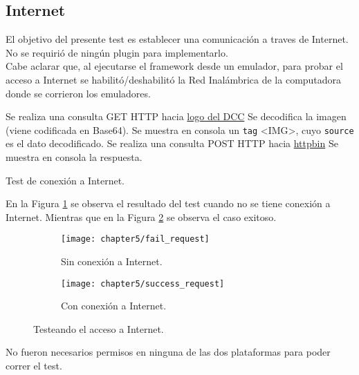 \subsection{Internet}
El objetivo del presente test es establecer una comunicación a traves de Internet. No se requirió de ningún plugin para implementarlo.\\
Cabe aclarar que, al ejecutarse el framework desde un emulador, para probar el acceso a Internet se habilitó/deshabilitó la Red Inalámbrica de la computadora donde se corrieron los emuladores.\\
\begin{algorithm}
	\begin{algorithmic}[1]
		\STATE Se realiza una consulta GET HTTP hacia \href{https://dcc.fceia.unr.edu.ar/sites/all/themes/birthofcool/images/logo-lcc.png}{logo del DCC}
		\STATE Se decodifica la imagen (viene codificada en Base64).
		\STATE Se muestra en consola un \texttt{tag} \textless IMG\textgreater, cuyo \texttt{source} es el dato decodificado.
		\STATE Se realiza una consulta POST HTTP hacia \href{http://httpbin.org/post}{httpbin}
		\STATE Se muestra en consola la respuesta.
	\end{algorithmic}
	\caption{Test de conexión a Internet.}\label{alg:chap5_test_internet}
\end{algorithm}
En la Figura \ref{fig:ch05:fail_request} se observa el resultado del test cuando no se tiene conexión a Internet. Mientras que en la Figura \ref{fig:ch05:success_request} se observa el caso exitoso.\\
\begin{figure}[hbtp]
    \centering
    \begin{subfigure}{.3\linewidth}
		\texttt{[image: chapter5/fail\_request]}
		\caption{Sin conexión a Internet.}
		\label{fig:ch05:fail_request}
	\end{subfigure}
	\begin{subfigure}{.3\linewidth}
		\texttt{[image: chapter5/success\_request]}
		\caption{Con conexión a Internet.}
		\label{fig:ch05:success_request}
	\end{subfigure}
	\caption{Testeando el acceso a Internet.}
	\label{fig:ch05:internet_test}
\end{figure}
No fueron necesarios permisos en ninguna de las dos plataformas para poder correr el test.

